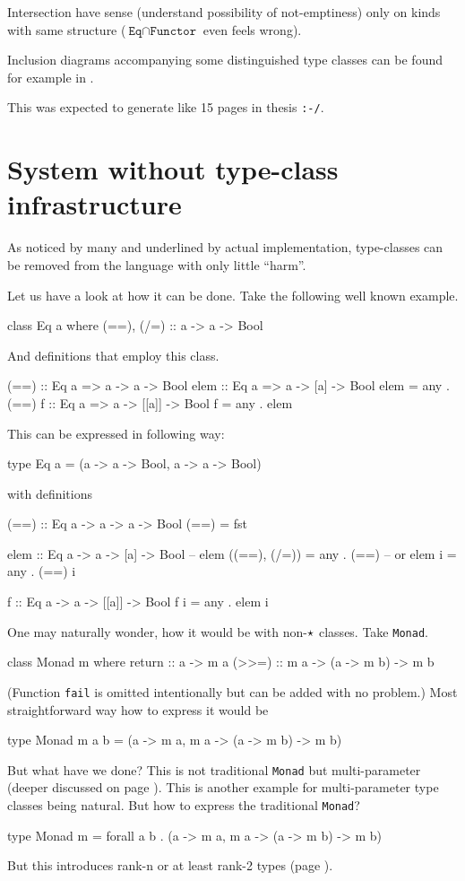 \documentclass[11pt,oneside,draft]{fithesis2}
\newcommand\uv[1]{``#1''}
\theoremstyle{definition}
\begin{document}
Intersection have sense (understand possibility of not-emptiness) only on
kinds with same structure (\(\texttt{Eq} \cap \texttt{Functor}\) even feels wrong).

Inclusion diagrams accompanying some distinguished type classes can be found for
example in \cite{typeclassopedia}.

This was expected to generate like 15 pages in thesis \verb~:-/~.

\section{System without type-class infrastructure}

As noticed by many and underlined by actual implementation, type-classes can be removed
from the language with only little \uv{harm}.

Let us have a look at how it can be done. Take the following well known example.
\begin{code}
class Eq a where
    (==), (/=) :: a -> a -> Bool
\end{code}
And definitions that employ this class.
\begin{code}
(==) :: Eq a => a -> a -> Bool
elem :: Eq a => a -> [a] -> Bool
elem = any . (==)
f :: Eq a => a -> [[a]] -> Bool
f = any . elem
\end{code}
This can be expressed in following way:
\begin{code}
type Eq a = (a -> a -> Bool, a -> a -> Bool)
\end{code}
with definitions
\begin{code}
(==) :: Eq a -> a -> a -> Bool
(==) = fst

elem :: Eq a -> a -> [a] -> Bool
-- elem ((==), (/=)) = any . (==)
-- or
elem i = any . (==) i

f :: Eq a -> a -> [[a]] -> Bool
f i = any . elem i
\end{code}

One may naturally wonder, how it would be with non-\(\star\) classes.
Take \texttt{Monad}.
\begin{code}
class Monad m where
	return :: a -> m a
	(>>=) :: m a -> (a -> m b) -> m b
\end{code}
(Function \texttt{fail} is omitted intentionally but can be added with
no problem.)
Most straightforward way how to express it would be
\begin{code}
type Monad m a b = (a -> m a, m a -> (a -> m b) -> m b)
\end{code}
But what have we done? This is not traditional \texttt{Monad}
but multi-parameter (deeper discussed on page
\pageref{extension:multiparam}). This is another example for
multi-parameter type classes being natural. But how to express the
traditional \texttt{Monad}?
\begin{code}
type Monad m = forall a b . (a -> m a, m a -> (a -> m b) -> m b)
\end{code}
But this introduces rank-n or at least rank-2 types (page
\pageref{extension:rankn}).
\end{document}
